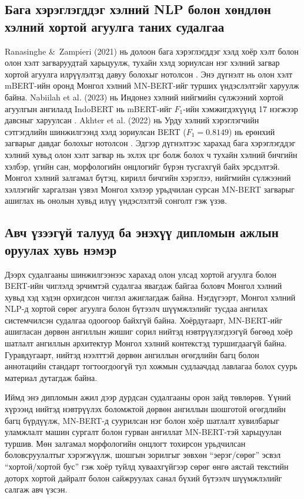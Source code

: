 \subsection{Бага хэрэглэгддэг хэлний NLP болон хөндлөн хэлний хортой агуулга
таних судалгаа}

Ranasinghe \&\ Zampieri (2021) нь долоон бага хэрэглэгддэг хэлд хоёр хэлт болон
олон хэлт загваруудтай харьцуулж, тухайн хэлд зориулсан нэг хэлний загвар
хортой агуулга илрүүлэлтэд давуу болохыг нотолсон \cite{ranasinghe2021}. Энэ
дүгнэлт нь олон хэлт mBERT-ийн оронд Монгол хэлний MN-BERT-ийг турших
үндэслэлтэйг харуулж байна.
Nabiilah et al. (2023) нь Индонез хэлний нийгмийн сүлжээний хортой агуулгын
ангилалд IndoBERT нь mBERT-ийг $F_1$-ийн хэмжигдэхүүнд 17 нэгжээр давсныг
харуулсан \cite{nabiilah2023bert}. Akhter et al. (2022) нь Урду хэлний
хэрэглэгчийн сэтгэгдлийн шинжилгээнд хэлд зориулсан BERT ($F_1{=}0.8149$) нь
ерөнхий загварыг давдаг болохыг нотолсон \cite{akhter2022multi}.
Эдгээр дүгнэлтээс харахад бага хэрэглэгддэг хэлний хувьд олон хэлт загвар нь
эхлэх цэг болж болох ч тухайн хэлний бичгийн хэлбэр, үгийн сан, морфологийн
онцлогийг бүрэн тусгахгүй байх эрсдэлтэй. Монгол хэлний залгамал бүтэц,
кирилл бичгийн хэрэглээ, нийгмийн сүлжээний хэллэгийг харгалзан үзвэл
Монгол хэлээр урьдчилан сурсан MN-BERT загварыг ашиглах нь онолын хувьд илүү
үндэслэлтэй сонголт гэж үзэв.

\subsection{Авч үзээгүй талууд ба энэхүү дипломын ажлын оруулах хувь нэмэр}

Дээрх судалгааны шинжилгээнээс харахад олон улсад хортой агуулга болон
BERT-ийн чиглэлд эрчимтэй судалгаа явагдаж байгаа боловч Монгол хэлний хувьд
хэд хэдэн орхигдсон чиглэл ажиглагдаж байна. Нэгдүгээрт, Монгол хэлний
NLP-д хортой сөрөг агуулга болон бүтээлч шүүмжлэлийг тусдаа ангилах
системчилсэн судалгаа одоогоор байхгүй байна. Хоёрдугаарт, MN-BERT-ийг
ашигласан дөрвөн ангиллын жишиг сорил нийтэд нэвтрүүлэгдээгүй бөгөөд хоёр
шатлалт ангиллын архитектур Монгол хэлний контекстэд туршигдаагүй байна.
Гуравдугаарт, нийтэд нээлттэй дөрвөн ангиллын өгөгдлийн багц болон аннотацийн стандарт
тогтоогдоогүй тул хожмын судлаачдад лавлагаа болох суурь материал дутагдаж
байна.

Иймд энэ дипломын ажил дээр дурдсан судалгааны орон зайд төвлөрөв. Үүний
хүрээнд нийтэд нэвтрүүлэх боломжтой дөрвөн ангиллын шошготой өгөгдлийн багц бүрдүүлж,
MN-BERT-д суурилсан нэг болон хоёр шатлалт хувилбарыг уламжлалт машин сургалт
болон гурван ангиллат MN-BERT-тэй харьцуулан туршив. Мөн залгамал морфологийн
онцлогт тохирсон урьдчилсан боловсруулалтыг хэрэгжүүлж, шошгын зорилгыг зөвхөн
``эерэг/сөрөг'' эсвэл ``хортой/хортой бус'' гэж хоёр туйлд хуваахгүйгээр сөрөг
өнгө аястай текстийн доторх хортой дайралт болон сайжруулах санал бүхий
бүтээлч шүүмжлэлийг салгаж авч үзсэн.

